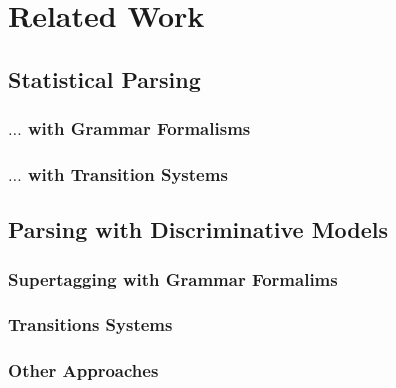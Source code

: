 \documentclass[../document.tex]{subfiles}
\begin{document}
    \chapter{Related Work}
    \section{Statistical Parsing}
    \subsection{$\ldots$ with Grammar Formalisms}
    \subsection{$\ldots$ with Transition Systems}
    \section{Parsing with Discriminative Models}
    \subsection{Supertagging with Grammar Formalims}
    \subsection{Transitions Systems}
    \subsection{Other Approaches}
\end{document}
